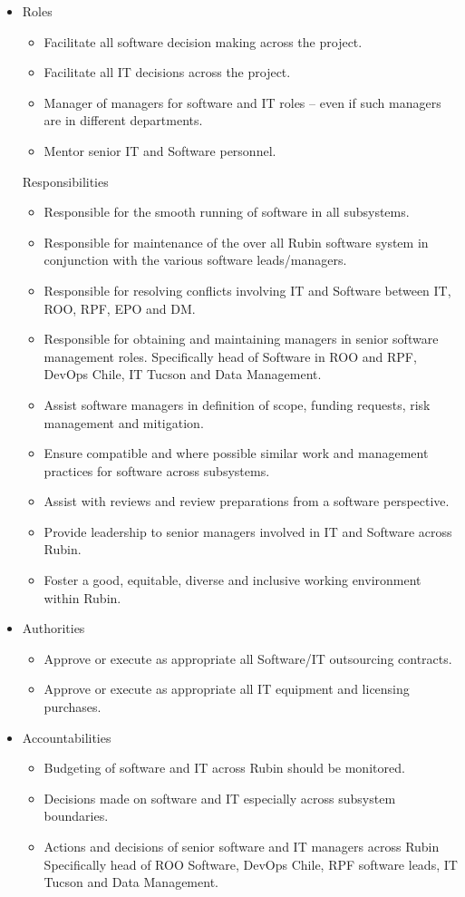 \begin{itemize}
\item Roles
\begin{itemize}
\item Facilitate all software decision making across the project.
\item Facilitate all IT decisions across the project.
\item Manager of managers for software and IT roles – even if such managers are in different
departments.
\item Mentor senior IT and Software personnel.
\end{itemize}
Responsibilities
\begin{itemize}
\item Responsible for the smooth running of software in all subsystems.
\item Responsible for maintenance of the over all Rubin software system in conjunction  with the various software leads/managers.
\item Responsible for resolving conflicts involving IT and Software between IT, ROO, RPF, EPO  and DM.
\item Responsible for obtaining and maintaining managers in senior software management roles.
Specifically head of Software in ROO and RPF, DevOps Chile, IT Tucson and Data Management.
\item Assist software managers in definition of scope, funding requests, risk management
and mitigation.
\item Ensure compatible and where possible similar work and management practices for
software across subsystems.
\item Assist with reviews and review preparations from a software perspective.
\item Provide leadership to senior managers involved in IT and Software across Rubin.
\item Foster a good, equitable, diverse and inclusive working environment within Rubin.
\end{itemize}

\item Authorities
\begin{itemize}
\item Approve or execute as appropriate all Software/IT outsourcing contracts.
\item Approve or execute as appropriate all IT equipment and licensing purchases.
\end{itemize}
\item Accountabilities
\begin{itemize}
\item Budgeting of software and IT across Rubin should be monitored.
\item Decisions made on software and IT especially across subsystem boundaries.
\item Actions and decisions of senior software and IT managers across Rubin Specifically head of ROO Software, DevOps Chile,  RPF software leads, IT Tucson and Data Management.

\end{itemize}
\end{itemize}
